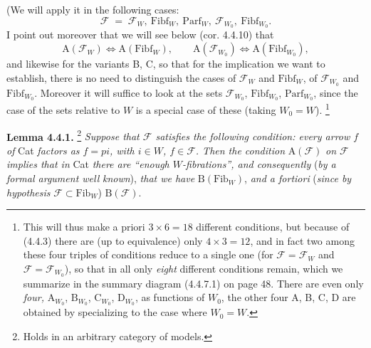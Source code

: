 \documentclass[11pt]{article}
\newcommand{\printedpage}[1]{\marginpar{\footnotesize p.~#1}}
\newcommand{\msp}[1]{\marginpar{\footnotesize [#1]}}
\newcommand{\cF}{\mathcal{F}}
\newcommand{\Fib}{\mathrm{Fib}}
\newcommand{\Fibf}{\mathrm{Fibf}}
\newcommand{\Parf}{\mathrm{Parf}}
\begin{document}
(We will apply it in the following cases: %
\[
\cF \;=\; \cF_W,\ \Fibf_W,\ \Parf_W,\ \cF_{W_0},\ \Fibf_{W_0}.
\tag*{(4.4.2)}
\]
I point out moreover that we will see below (cor. 4.4.10) that
\[
\mathrm{A}(\cF_W) \iff \mathrm{A}(\Fibf_W), \qquad \mathrm{A}(\cF_{W_0}) \iff \mathrm{A}(\Fibf_{W_0}),
\tag*{(4.4.3)}
\]
and likewise for the variants B, C, so that for the implication we want to establish, there is no need to distinguish the cases of $\cF_W$ and $\Fibf_W$, of $\cF_{W_0}$ and $\Fibf_{W_0}$. Moreover it will suffice to look at the sets $\cF_{W_0}$, $\Fibf_{W_0}$, $\Parf_{W_0}$, since the case of the sets relative to $W$ is a special case of these (taking $W_0 = W$). \footnote[28]{This will thus make a priori $3 \times 6 = 18$ different conditions, but because of (4.4.3) there are (up to equivalence) only $4 \times 3 = 12$, and in fact two among these four triples of conditions reduce to a single one (for $\cF = \cF_W$ and $\cF = \cF_{W_0}$), so that in all only \textit{eight} different conditions remain, which we summarize in the summary diagram (4.4.7.1) on page 48. There are even only \textit{four,} $\mathrm{A}_{W_0}$, $\mathrm{B}_{W_0}$, $\mathrm{C}_{W_0}$, $\mathrm{D}_{W_0}$, as functions of $W_0$, the other four A, B, C, D are obtained by specializing to the case where $W_0 = W$.}

\printedpage{25}

\textbf{Lemma 4.4.1.} \footnote[29]{Holds in an arbitrary category of models.} \textit{Suppose that $\cF$ satisfies the following condition: every arrow $f$ of} Cat \textit{factors as $f = pi$, with $i \in W$, $f \in \cF$. Then the condition} $\mathrm{A}(\cF)$ \textit{on $\cF$ implies that in} Cat \textit{there are ``enough $W$-fibrations'', and consequently} (\textit{by a formal argument well} %
\msp{page 42}
\textit{known}), \textit{that we have} $\mathrm{B}(\Fib_W)$, \textit{and a fortiori} (\textit{since by hypothesis} $\cF \subset \Fib_W$) $\mathrm{B}(\cF)$.
\end{document}
